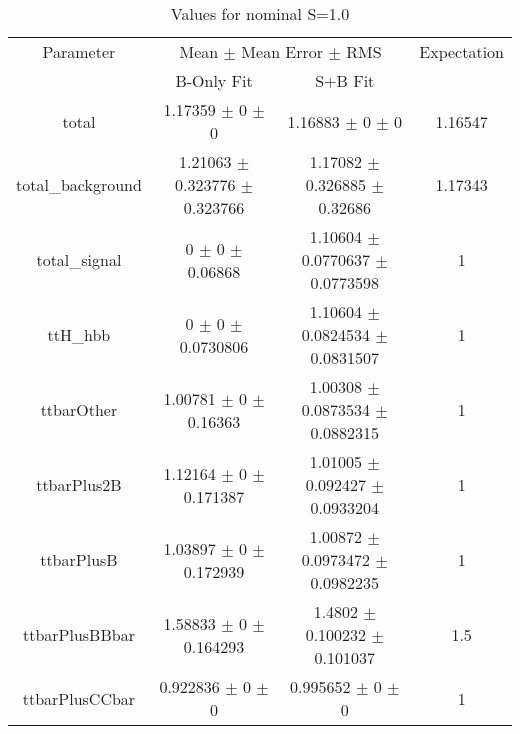 \begin{table}
\centering
\caption{Values for nominal S=1.0}
\begin{tabular}{cccc}
\toprule
Parameter & \multicolumn{2}{c}{Mean $\pm$ Mean Error $\pm$ RMS} & Expectation\\
 & B-Only Fit & S+B Fit & \\
\midrule
total & \num{1.17359} $\pm$ \num{0} $\pm$ \num{0} & \num{1.16883} $\pm$ \num{0} $\pm$ \num{0} & \num{1.16547}\\
total\_background & \num{1.21063} $\pm$ \num{0.323776} $\pm$ \num{0.323766} & \num{1.17082} $\pm$ \num{0.326885} $\pm$ \num{0.32686} & \num{1.17343}\\
total\_signal & \num{0} $\pm$ \num{0} $\pm$ \num{0.06868} & \num{1.10604} $\pm$ \num{0.0770637} $\pm$ \num{0.0773598} & \num{1}\\
ttH\_hbb & \num{0} $\pm$ \num{0} $\pm$ \num{0.0730806} & \num{1.10604} $\pm$ \num{0.0824534} $\pm$ \num{0.0831507} & \num{1}\\
ttbarOther & \num{1.00781} $\pm$ \num{0} $\pm$ \num{0.16363} & \num{1.00308} $\pm$ \num{0.0873534} $\pm$ \num{0.0882315} & \num{1}\\
ttbarPlus2B & \num{1.12164} $\pm$ \num{0} $\pm$ \num{0.171387} & \num{1.01005} $\pm$ \num{0.092427} $\pm$ \num{0.0933204} & \num{1}\\
ttbarPlusB & \num{1.03897} $\pm$ \num{0} $\pm$ \num{0.172939} & \num{1.00872} $\pm$ \num{0.0973472} $\pm$ \num{0.0982235} & \num{1}\\
ttbarPlusBBbar & \num{1.58833} $\pm$ \num{0} $\pm$ \num{0.164293} & \num{1.4802} $\pm$ \num{0.100232} $\pm$ \num{0.101037} & \num{1.5}\\
ttbarPlusCCbar & \num{0.922836} $\pm$ \num{0} $\pm$ \num{0} & \num{0.995652} $\pm$ \num{0} $\pm$ \num{0} & \num{1}\\
\bottomrule
\end{tabular}
\end{table}